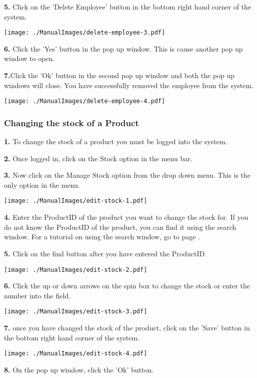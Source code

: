 \textbf{5.} Click on the 'Delete Employee' button in the bottom right hand corner of the system.

\texttt{[image: ./ManualImages/delete-employee-3.pdf]}

\textbf{6.} Click the 'Yes' button in the pop up window. This is cause another pop up window to open.

\textbf{7.}Click the 'Ok' button in the second pop up window and both the pop up windows will close. You have successfully removed the employee from the system.

\texttt{[image: ./ManualImages/delete-employee-4.pdf]}

\pagebreak
\subsubsection{Changing the stock of a Product}
\label{fig:Changing the stock of a Product}

\textbf{1.} To change the stock of a product you must be logged into the system.

\textbf{2.} Once logged in, click on the Stock option in the menu bar.

\textbf{3.} Now click on the Manage Stock option from the drop down menu. This is the only option in the menu.

\texttt{[image: ./ManualImages/edit-stock-1.pdf]}

\textbf{4.} Enter the ProductID of the product you want to change the stock for. If you do not know the ProductID of the product, you can find it using the search window. For a tutorial on using the search window, go to page \pageref{fig:Using the search window}.

\textbf{5.} Click on the find button after you have entered the ProductID.

\texttt{[image: ./ManualImages/edit-stock-2.pdf]}

\textbf{6.} Click the up or down arrows on the spin box to change the stock or enter the number into the field.

\texttt{[image: ./ManualImages/edit-stock-3.pdf]}

\textbf{7.} once you have changed the stock of the product, click on the 'Save' button in the bottom right hand corner of the system.

\texttt{[image: ./ManualImages/edit-stock-4.pdf]}

\textbf{8.} On the pop up window, click the 'Ok' button.

